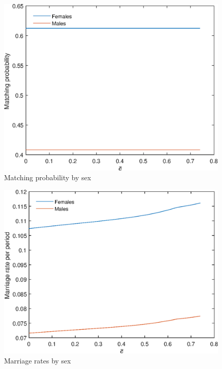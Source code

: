\documentclass[12pt]{article}
\begin{document}
\begin{figure}
	\centering
	\caption{Matching probability by sex}
	\includegraphics{Graphs/match_prob_cbar_ex1.eps}
\end{figure}

\begin{figure}
	\centering
	\caption{Marriage rates by sex}
	\includegraphics{Graphs/marr_rates_cbar_ex1.eps}
\end{figure}
\end{document}
